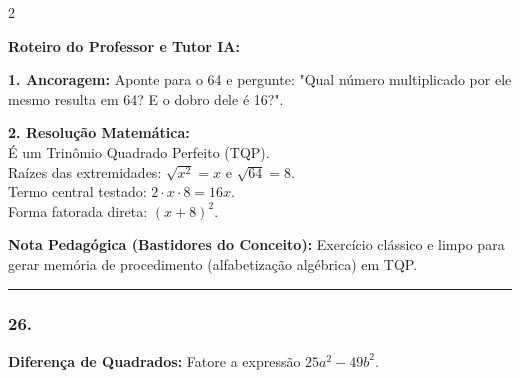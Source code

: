 \begin{multicols*}{2}
\ifgabarito
    \begin{tcolorbox}[colback=CorTitUm!5, colframe=CorTitUm, boxrule=1pt, arc=4pt, left=6pt, right=6pt, top=6pt, bottom=6pt]
    \small\textbf{\textcolor{CorTitUm}{Roteiro do Professor e Tutor IA:}}\par\vspace{0.1cm}
    \color{CinzaEscuro}
    \textbf{1. Ancoragem:} Aponte para o 64 e pergunte: "Qual número multiplicado por ele mesmo resulta em 64? E o dobro dele é 16?".\par\vspace{0.1cm}
    \textbf{2. Resolução Matemática:}\\
    É um Trinômio Quadrado Perfeito (TQP).\\
    Raízes das extremidades: $\sqrt{x^2} = x$ e $\sqrt{64} = 8$.\\
    Termo central testado: $2 \cdot x \cdot 8 = 16x$.\\
    Forma fatorada direta: $(x + 8)^2$.
    \end{tcolorbox}
    \vspace{0.15cm}
    
    \begin{boxexplicacao}
    \textbf{Nota Pedagógica (Bastidores do Conceito):} Exercício clássico e limpo para gerar memória de procedimento (alfabetização algébrica) em TQP.
    \end{boxexplicacao}
\fi

\par\vspace{\espacoQuestao}

\noindent\textcolor{CorLinha}{\rule{\linewidth}{0.5pt}} 
\par\vspace{\espacoPreQuestao}
\subsubsection*{26.} 
\begin{enunciadoLiteral}
\textbf{Diferença de Quadrados:} Fatore a expressão $25a^2 - 49b^2$.
\end{enunciadoLiteral}


\end{multicols*}

